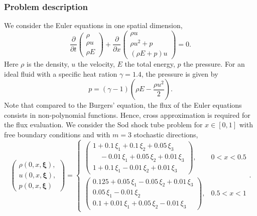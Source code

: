 \documentclass{article}
\newcommand{\bfxi}{ {\bm \xi} }
\begin{document}
\subsubsection{Problem description}
We consider the Euler equations in one spatial dimension,
\begin{equation}
    \frac{\partial}{\partial t}
    \begin{pmatrix}
        \rho \\ \rho u \\ \rho E
    \end{pmatrix}
    +
    \frac{\partial}{\partial x}
    \begin{pmatrix}
        \rho u \\ \rho u^2 + p \\ (\rho E+p)u
    \end{pmatrix}
    = 0.
\end{equation}
Here $\rho$ is the density, $u$ the velocity, $E$ the total energy, $p$ the pressure. 
For an ideal fluid with a specific heat ration $\gamma=1.4$, the pressure is given by 
\begin{equation}
    p = (\gamma-1) (\rho E-\frac{\rho u^2}{2}).
\end{equation}
Note that compared to the Burgers' equation, the flux of the Euler equations consists in non-polynomial functions. Hence, cross approximation is required for the flux evaluation. 
We consider the Sod shock tube problem for $x \in [0,1]$ with free boundary conditions and with $m=3$ stochastic directions, 
\begin{equation}
    \begin{pmatrix}
        \rho(0,x,\bfxi), 
        \\
        u (0,x,\bfxi), 
        \\
        p(0,x,\bfxi)
    \end{pmatrix}
    = 
    \begin{cases}
        \begin{pmatrix}
            1 + 0.1 \, \xi_1 + 0.1 \, \xi_2 + 0.05 \, \xi_3
            \\ 
            \quad -0.01 \, \xi_1 + 0.05 \, \xi_2 + 0.01 \, \xi_3
            \\ 
            1 + 0.1 \, \xi_1 - 0.01 \, \xi_2 + 0.01 \, \xi_3
        \end{pmatrix} , & 0<x<0.5
        \\[20pt]
        \begin{pmatrix}
            0.125 + 0.05 \, \xi_1 - 0.05 \, \xi_2 + 0.01 \, \xi_3
            \\ 
            0.05 \, \xi_1 - 0.01 \, \xi_2
            \\ 
            0.1 + 0.01 \, \xi_1 + 0.05 \, \xi_2 - 0.01 \, \xi_3
        \end{pmatrix} , & 0.5<x<1
    \end{cases}
    .
\end{equation}
\end{document}
